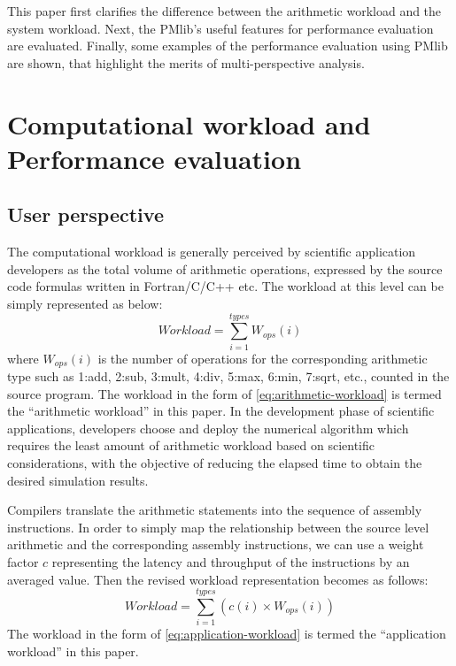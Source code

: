 \documentclass[conference]{IEEEtran}
\begin{document}
This paper first clarifies the difference between the arithmetic workload and
the system workload.
Next, the PMlib's useful features for performance evaluation are evaluated.
Finally, some examples of the performance evaluation using PMlib
are shown, that highlight the merits of multi-perspective analysis.

\section{Computational workload and Performance evaluation}
\label{workload-evaluation}

\subsection{User perspective}
\label{subsection:user-perspective}

The computational workload is generally perceived by scientific application
developers as the total volume of arithmetic operations,
expressed by the source code formulas written in Fortran/C/C++ etc.
The workload at this level can be simply represented as below:
\begin{equation}\label{eq:arithmetic-workload}
	Workload = \sum_{i=1}^{types} W_{ops}(i)
\end{equation}
where $ W_{ops}(i) $ is the number of operations for the
corresponding arithmetic type such as
1:add, 2:sub, 3:mult, 4:div, 5:max, 6:min, 7:sqrt, etc.,
counted in the source program.
The workload in the form of \eqref{eq:arithmetic-workload}
is termed the ``arithmetic workload'' in this paper.
In the development phase of scientific applications, developers
choose and deploy the numerical algorithm which requires the least
amount of arithmetic workload based on scientific considerations,
with the objective of reducing the elapsed time to obtain the desired
simulation results.

Compilers translate the arithmetic statements into the sequence of
assembly instructions.
In order to simply map the relationship between the source level arithmetic
and the corresponding assembly instructions,
we can use a weight factor $ c $  %
representing the latency and throughput of the instructions
by an averaged value.
Then the revised workload representation becomes as follows:
\begin{equation}\label{eq:application-workload}
		Workload = \sum_{i=1}^{types} \left(c(i)\times W_{ops}(i)\right)
\end{equation}
%
The workload in the form of \eqref{eq:application-workload}
is termed the ``application workload'' in this paper.
\end{document}
